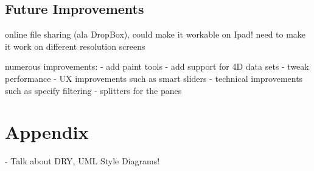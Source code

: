 \documentclass[a4paper,11pt,titlepage]{article}
\begin{document}
\subsection{Future Improvements}

online file sharing (ala DropBox), could make it workable on Ipad!
need to make it work on different resolution screens

numerous improvements:
- add paint tools
- add support for 4D data sets
- tweak performance
- UX improvements such as smart sliders
- technical improvements such as specify filtering
- splitters for the panes











\newpage

\begin{thebibliography}{1}

\end{thebibliography}

\newpage

\section{Appendix}



- Talk about DRY, UML Style Diagrams!
\end{document}
